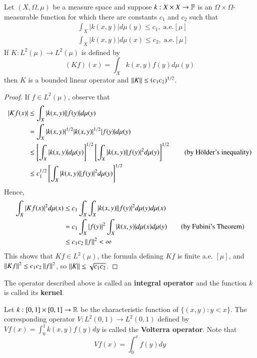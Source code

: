 \begin{thm}
    Let $(X,\Omega,\mu)$ be a measure space and suppose $k:X\times X\rightarrow \mathbb F$ is an $\Omega\times \Omega$-measurable function for which there are constants $c_1$ and $c_2$ such that \begin{align*}
        &\int_X|k(x,y)|d\mu(y) \leq c_1,\;\text{a.e.}[\mu] \\
        &\int_X|k(x,y)|d\mu(x) \leq c_2,\;\text{a.e.}[\mu]
    \end{align*}
    If $K:L^2(\mu)\rightarrow L^2(\mu)$ is defined by $$(Kf)(x) = \int_Xk(x,y)f(y)d\mu(y)$$
    then $K$ is a bounded linear operator and $\left|\left| K\right|\right| \leq (c_1c_2)^{1/2}$.
\end{thm}
\begin{proof}
    If $f \in L^2(\mu)$, observe that \begin{align*}
        |Kf(x)| &\leq \int_X|k(x,y)||f(y)|d\mu(y) \\
        &= \int_X|k(x,y)|^{1/2}|k(x,y)|^{1/2}|f(y)|d\mu(y) \\
        &\leq \left[\int_X|k(x,y)|d\mu(y)\right]^{1/2}\left[\int_X|k(x,y)||f(y)|^2d\mu(y)\right]^{1/2} \tag{by H\"{o}lder's inequality} \\
        &\leq c_1^{1/2}\left[\int_X|k(x,y)||f(y)|^2d\mu(y)\right]^{1/2}
    \end{align*}
    Hence, \begin{align*}
        \int_X|Kf(x)|^2 d\mu(x) &\leq c_1 \int_X\int_X|k(x,y)||f(y)|^2d\mu(y)d\mu(x) \\
        &= c_1\int_X|f(y)|^2\int_X|k(x,y)|d\mu(x)d\mu(y) \tag{by Fubini's Theorem} \\
        &\leq c_1c_2\left|\left| f\right|\right|^2 < \infty
    \end{align*}
    This shows that $Kf \in L^2(\mu)$, the formula defining $Kf$ is finite a.e. $[\mu]$, and $\left|\left| Kf\right|\right|^2 \leq c_1c_2\left|\left| f\right|\right|^2$, so $\left|\left| K\right|\right| \leq \sqrt{c_1c_2}$.
\end{proof}

The operator described above is called an \textbf{integral operator} and the function $k$ is called its \textbf{kernel}.

\begin{eg}
    Let $k:[0,1]\times [0,1]\rightarrow \mathbb R$ be the characteristic function of $\{(x,y): y < x\}$. The corresponding operator $V:L^2(0,1)\rightarrow L^2(0,1)$ defined by $Vf(x) = \int_0^1k(x,y)f(y)dy$ is called the \textbf{Volterra operator}. Note that $$Vf(x) = \int_0^xf(y)dy$$
\end{eg}

